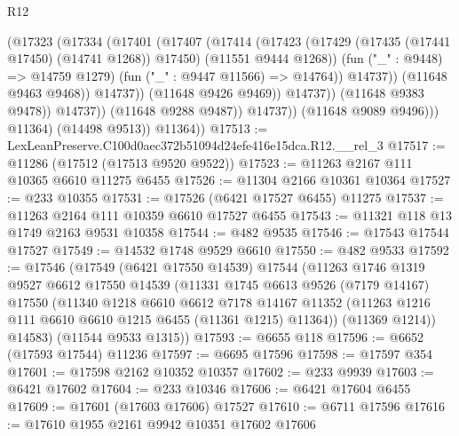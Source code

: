 \begin{lexlean}{R12}
\begin{coremodule}
                                    (@17323
                                      (@17334
                                        (@17401
                                          (@17407
                                            (@17414
                                              (@17423
                                                (@17429
                                                  (@17435 (@17441 @17450) (@14741 @1268))
                                                  @17450)
                                                (@11551 @9444 @1268))
                                              (fun ("_" : @9448) => @14759 @1279)
                                              (fun ("_" : @9447 @11566) => @14764))
                                            @14737))
                                        (@11648 @9463 @9468))
                                      @14737))
                                  (@11648 @9426 @9469))
                                @14737))
                            (@11648 @9383 @9478))
                          @14737))
                      (@11648 @9288 @9487))
                    @14737))
                (@11648 @9089 @9496)))
            @11364)
          (@14498 @9513))
        @11364))
@17513 := LexLeanPreserve.C100d0aec372b51094d24efe416e15dca.R12.__rel_3
@17517 := @11286 (@17512 (@17513 @9520 @9522))
@17523 := @11263 @2167 @111 @10365 @6610 @11275 @6455
@17526 := @11304 @2166 @10361 @10364
@17527 := @233 @10355
@17531 := @17526 (@6421 @17527 @6455) @11275
@17537 := @11263 @2164 @111 @10359 @6610 @17527 @6455
@17543 := @11321 @118 @13 @1749 @2163 @9531 @10358
@17544 := @482 @9535
@17546 := @17543 @17544 @17527
@17549 := @14532 @1748 @9529 @6610
@17550 := @482 @9533
@17592 := @17546
    (@17549
      (@6421 @17550 @14539)
      @17544
      (@11263
        @1746
        @1319
        @9527
        @6612
        @17550
        @14539
        (@11331
          @1745
          @6613
          @9526
          (@7179 @14167)
          @17550
          (@11340
            @1218
            @6610
            @6612
            @7178
            @14167
            @11352
            (@11263 @1216 @111 @6610 @6610 @1215 @6455 (@11361 @1215) @11364))
          (@11369 @1214))
        @14583)
      (@11544 @9533 @1315))
@17593 := @6655 @118
@17596 := @6652 (@17593 @17544) @11236
@17597 := @6695 @17596
@17598 := @17597 @354
@17601 := @17598 @2162 @10352 @10357
@17602 := @233 @9939
@17603 := @6421 @17602
@17604 := @233 @10346
@17606 := @6421 @17604 @6455
@17609 := @17601 (@17603 @17606) @17527
@17610 := @6711 @17596
@17616 := @17610 @1955 @2161 @9942 @10351 @17602 @17606

\end{coremodule}
\end{lexlean}
